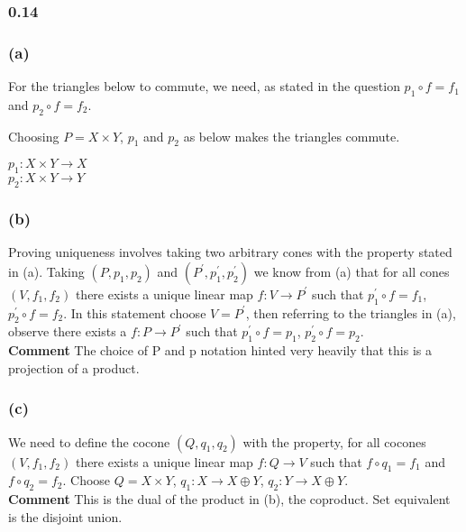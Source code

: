 \documentclass{article}
\begin{document}
\subsubsection*{0.14}
\subsubsection*{(a)}

For the triangles below to commute, we need, as stated in the question $p_1 \circ f = f_1$ and $p_2 \circ f = f_2$.\\
\begin{center}

 \break\hfill

\end{center}
Choosing $P=X\times{Y}$, $p_1$ and $p_2$ as below makes the triangles commute.
\begin{center}
$p_1\colon X\times{Y} \rightarrow X$ \\
$p_2\colon X\times{Y} \rightarrow Y$
\end{center}

\subsubsection*{(b)}

Proving uniqueness involves taking two arbitrary cones with the property stated in (a).
Taking $(P, p_1, p_2)$ and $(P^\prime, p_1^\prime, p_2^\prime)$
we know from (a) that for all cones $(V, f_1, f_2)$ there exists a unique linear map $f\colon V \rightarrow P^\prime$ such that $p_1^\prime \circ f = f_1$, $p_2^\prime \circ f = f_2$.
In this statement choose $V=P^\prime$, then referring to the triangles in (a), observe there exists a $f\colon P \rightarrow P^\prime$ such that $p_1^\prime \circ f = p_1$, $p_2^\prime \circ f = p_2$.\\

\textbf{Comment} The choice of P and p notation hinted very heavily that this is a projection of a product.

\subsubsection*{(c)}

We need to define the cocone $(Q, q_1, q_2)$ with the property, for all cocones $(V, f_1, f_2)$ there exists a unique linear map $f\colon Q \rightarrow V$ such that $f \circ q_1 = f_1$ and $f \circ q_2 = f_2$. Choose $Q= X \times Y$, $q_1\colon X \rightarrow X \oplus Y$, $q_2\colon Y \rightarrow X \oplus Y$. \\

\textbf{Comment} This is the dual of the product in (b), the coproduct. Set equivalent is the disjoint union.
\end{document}
